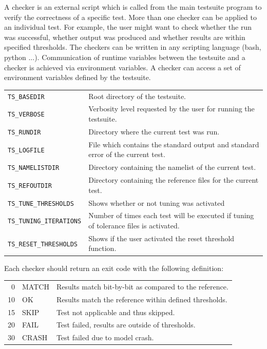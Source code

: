 \documentclass[12pt,twoside,a4paper]{report}
\begin{document}
A checker is an external script which is called from the main testsuite program to verify the correctness of a specific test. More than one checker can be applied to an individual test. For example, the user might want to check whether the run was successful, whether output was produced and whether results are within specified thresholds. The checkers can be written in any scripting language (bash, python ...). Communication of runtime variables between the testsuite and a checker is achieved via environment variables. A checker can access a set of environment variables defined by the testsuite.\\

\begin{tabular}{lp{10cm}}
\texttt{TS\_BASEDIR} & Root directory of the testsuite.\\[1.2ex]
\texttt{TS\_VERBOSE} & Verbosity level requested by the user for running the testsuite.\\[1.2ex]
\texttt{TS\_RUNDIR} & Directory where the current test was run.\\[1.2ex]
\texttt{TS\_LOGFILE} & File which contains the standard output and standard error of the current test.\\[1.2ex]
\texttt{TS\_NAMELISTDIR} & Directory containing the namelist of the current test.\\[1.2ex]
\texttt{TS\_REFOUTDIR} & Directory containing the reference files for the current test.\\[1.2ex]
\texttt{TS\_TUNE\_THRESHOLDS} & Shows whether or not tuning was activated\\[1.2ex]
\texttt{TS\_TUNING\_ITERATIONS} & Number of times each test will be executed if tuning of tolerance files is activated.\\[1.2ex]
\texttt{TS\_RESET\_THRESHOLDS} & Shows if the user activated the reset threshold function.\\[1.2ex]
\end{tabular}

Each checker should return an exit code with the following definition:\\

\begin{tabular}{rlp{10cm}}
0 & {\color{green} MATCH} & Results match bit-by-bit as compared to the reference.\\[1.2ex]
10 & {\color{green} OK} & Results match the reference within defined thresholds.\\[1.2ex]
15 & {\color{grey} SKIP} & Test not applicable and thus skipped.\\[1.2ex]
20 & {\color{red} FAIL} & Test failed, results are outside of thresholds.\\[1.2ex]
30 & {\color{red} CRASH} & Test failed due to model crash.\\[1.2ex]
\end{tabular}
\end{document}
